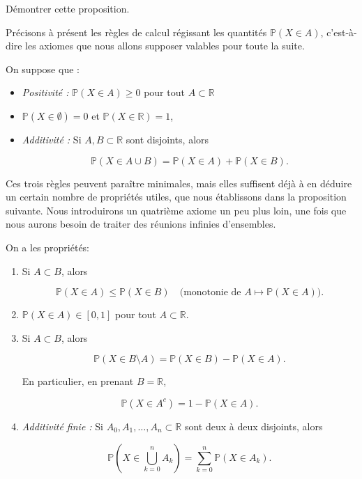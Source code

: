 \begin{exercice}
Démontrer cette proposition.
\end{exercice}

\newpage


Précisons à présent les règles de calcul régissant les quantités $\mathbb{P}(X \in A)$, c'est-à-dire les axiomes que nous allons supposer valables pour toute la suite.

\medskip

\begin{mdframed}
\begin{definition}
On suppose que :

\begin{itemize}
\item[$\boxed{1.}$] \textit{Positivité : } $\mathbb{P}(X \in A) \geq 0$ pour tout $A \subset \mathbb{R}$   
\item[$\boxed{2.}$] $\mathbb{P}(X \in \emptyset) = 0$ et $\mathbb{P}(X \in \mathbb{R}) = 1$,
\item[$\boxed{3.}$] \textit{Additivité : } Si $A, B \subset \mathbb{R}$ sont disjoints, alors

$$
\mathbb{P}(X \in A \cup B) = \mathbb{P}(X \in A) + \mathbb{P}(X \in B).
$$
\end{itemize}
\end{definition}
\end{mdframed}

Ces trois règles peuvent paraître minimales, mais elles suffisent déjà à en déduire un certain nombre de propriétés utiles, que nous établissons dans la proposition suivante. Nous introduirons un quatrième axiome un peu plus loin, une fois que nous aurons besoin de traiter des réunions infinies d'ensembles.

\medskip

\begin{mdframed}
\begin{proposition}
On a les propriétés:

\begin{enumerate}
\item Si $A \subset B$, alors

$$
\mathbb{P}(X \in A) \leq \mathbb{P}(X \in B) \quad \text{(monotonie de } A \mapsto \mathbb{P}(X \in A)\text{)}.
$$
\item $\mathbb{P}(X \in A) \in [0, 1]$ pour tout $A \subset \mathbb{R}$.
\item Si $A \subset B$, alors

$$
\mathbb{P}(X \in B \setminus A) = \mathbb{P}(X \in B) - \mathbb{P}(X \in A).
$$

En particulier, en prenant $B = \mathbb{R}$,

$$
\mathbb{P}(X \in A^c) = 1 - \mathbb{P}(X \in A).
$$
\item \textit{Additivité finie : } Si $A_0, A_1, \dots, A_n \subset \mathbb{R}$ sont deux à deux disjoints, alors

$$
\mathbb{P}\left(X \in \bigcup_{k=0}^n A_k\right) = \sum_{k=0}^n \mathbb{P}(X \in A_k).
$$
\end{enumerate}
\end{proposition}
\end{mdframed}

